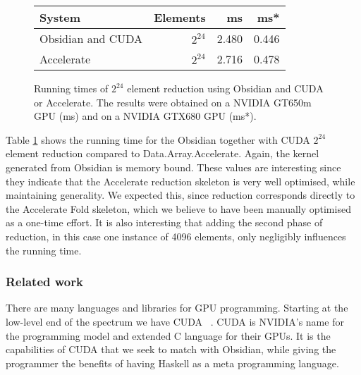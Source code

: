 \begin{figure}
\centering 
\begin{small}
\begin{tabular}{| l | r | r | r | }
\hline 
  System            & Elements & ms     & ms*   \\ \hline 
  Obsidian and CUDA & $2^{24}$  & 2.480  & 0.446 \\ \hline
  Accelerate        & $2^{24}$  & 2.716  & 0.478 \\ \hline
\end{tabular}
\caption{Running times of $2^{24}$ element reduction using Obsidian and CUDA 
or Accelerate. The results were obtained on a NVIDIA GT650m GPU (ms) 
and on a NVIDIA GTX680 GPU (ms*).}

\label{fig:CUDATABLE} 
\end{small}
\end{figure}

Table \ref{fig:CUDATABLE} shows the running time for the Obsidian together with 
CUDA $2^{24}$ element reduction compared to Data.Array.Accelerate. 
Again, the kernel generated from Obsidian is memory bound.
These values are 
interesting since they indicate that the Accelerate reduction skeleton is 
very well optimised, while maintaining generality. We expected this, since 
reduction corresponds directly to the Accelerate Fold skeleton, which
we believe to have been manually optimised as a one-time effort. It is also 
interesting that adding the second phase of reduction, in this case 
one instance of 4096 elements, only negligibly influences the running time.




\subsubsection{Related work}

There are many languages and libraries for GPU programming. Starting at the 
low-level end of the spectrum we have CUDA ~. CUDA is NVIDIA's 
name for the programming model and extended C language for their GPUs. 
It is 
the capabilities of CUDA that we seek to match with Obsidian,
while giving the programmer the benefits of having Haskell as a meta programming 
language. 

